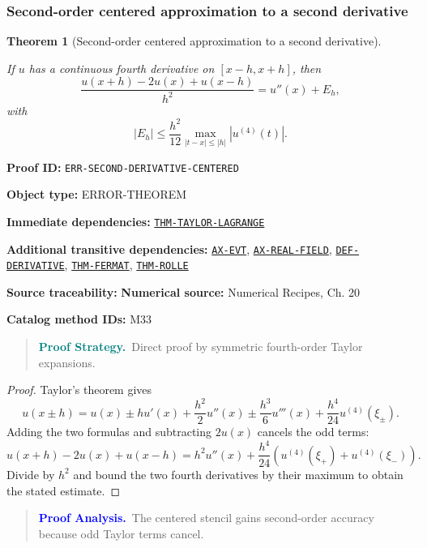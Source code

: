 \documentclass[10pt]{article}
\newcommand{\pidraw}[1]{\begingroup\urlstyle{tt}\nolinkurl{#1}\endgroup}
\newcommand{\pidref}[1]{\hyperref[prf:#1]{\pidraw{#1}}}
\newtheorem{theorem}{Theorem}[section]
\theoremstyle{definition}
\theoremstyle{remark}
\newenvironment{proofstrategy}
{\begin{quote}\small\noindent\textbf{\textcolor{teal}{Proof Strategy.}}\ }
{\end{quote}}
\newenvironment{proofanalysis}
{\begin{quote}\small\noindent\textbf{\textcolor{blue}{Proof Analysis.}}\ }
{\end{quote}}
\newcommand{\meta}[2]{\noindent\textbf{#1:} #2\par}
\begin{document}
\subsubsection{Second-order centered approximation to a second derivative}

\begin{theorem}[Second-order centered approximation to a second derivative]\label{prf:ERR-SECOND-DERIVATIVE-CENTERED}

If $u$ has a continuous fourth derivative on $[x-h,x+h]$, then
\[
\frac{u(x+h)-2u(x)+u(x-h)}{h^2}
=
u''(x)+E_h,
\]
with
\[
|E_h|
\le
\frac{h^2}{12}
\max_{|t-x|\le |h|}|u^{(4)}(t)|.
\]

\end{theorem}

\meta{Proof ID}{\pidraw{ERR-SECOND-DERIVATIVE-CENTERED}}
\meta{Object type}{ERROR-THEOREM}
\meta{Immediate dependencies}{\pidref{THM-TAYLOR-LAGRANGE}}
\meta{Additional transitive dependencies}{\pidref{AX-EVT}, \pidref{AX-REAL-FIELD}, \pidref{DEF-DERIVATIVE}, \pidref{THM-FERMAT}, \pidref{THM-ROLLE}}
\meta{Source traceability}{\textbf{Numerical source:} Numerical Recipes, Ch. 20}
\meta{Catalog method IDs}{M33}

\begin{proofstrategy}Direct proof by symmetric fourth-order Taylor expansions.\end{proofstrategy}

\begin{proof}

Taylor's theorem gives
\[
u(x\pm h)
=
u(x)\pm hu'(x)+\frac{h^2}{2}u''(x)
\pm\frac{h^3}{6}u'''(x)
+\frac{h^4}{24}u^{(4)}(\xi_\pm).
\]
Adding the two formulas and subtracting $2u(x)$ cancels the odd terms:
\[
u(x+h)-2u(x)+u(x-h)
=
h^2u''(x)
+\frac{h^4}{24}\left(u^{(4)}(\xi_+)+u^{(4)}(\xi_-)\right).
\]
Divide by $h^2$ and bound the two fourth derivatives by their maximum to obtain
the stated estimate.

\end{proof}

\begin{proofanalysis}The centered stencil gains second-order accuracy because odd Taylor terms cancel.\end{proofanalysis}
\end{document}
